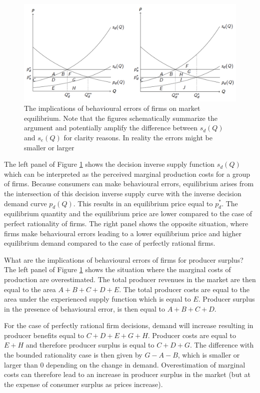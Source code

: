 \documentclass[
]{book}
\begin{document}
\begin{figure}
\includegraphics[width=16.61in]{./figures/firmerror} \caption{The implications of behavioural errors of firms on market equilibrium. Note that the figures schematically summarize the argument and potentially amplify the difference between $s_d (Q)$ and $s_e (Q)$ for clarity reasons. In reality the errors might be smaller or larger}\label{fig:firmerror}
\end{figure}

The left panel of Figure \ref{fig:firmerror} shows the decision inverse supply function \(s_d (Q)\) which can be interpreted as the perceived marginal production costs for a group of firms. Because consumers can make behavioural errors, equilibrium arises from the intersection of this decision inverse supply curve with the inverse decision demand curve \(p_d (Q)\). This results in an equilibrium price equal to \(p^*_d\). The equilibrium quantity and the equilibrium price are lower compared to the case of perfect rationality of firms. The right panel shows the opposite situation, where firms make behavioural errors leading to a lower equilibrium price and higher equilibrium demand compared to the case of perfectly rational firms.

What are the implications of behavioural errors of firms for producer surplus? The left panel of Figure \ref{fig:firmerror} shows the situation where the marginal costs of production are overestimated. The total producer revenues in the market are then equal to the area \(A+B+C+D+E\). The total producer costs are equal to the area under the experienced supply function which is equal to \(E\). Producer surplus in the presence of behavioural error, is then equal to \(A+B+C+D\).

For the case of perfectly rational firm decisions, demand will increase resulting in producer benefits equal to \(C+D+E+G+H\). Producer costs are equal to \(E+H\) and therefore producer surplus is equal to \(C+D+G\). The difference with the bounded rationality case is then given by \(G-A-B\), which is smaller or larger than \(0\) depending on the change in demand. Overestimation of marginal costs can therefore lead to an increase in producer surplus in the market (but at the expense of consumer surplus as prices increase).
\end{document}
